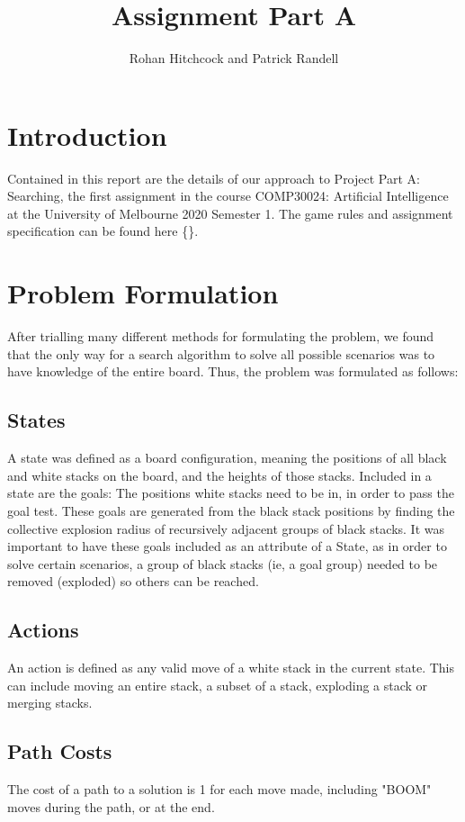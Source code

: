 \documentclass[11pt]{article}
\begin{document}
    \title{\textbf{Assignment Part A}}
    \author{Rohan Hitchcock and Patrick Randell}
    \date{}
    \maketitle
    \section{Introduction}\label{sec:introduction}
    Contained in this report are the details of our approach to Project Part A: Searching, the first assignment in the course
    COMP30024: Artificial Intelligence at the University of Melbourne 2020 Semester 1.
    The game rules and assignment specification
    can be found here \{\}.

    \section{Problem Formulation}\label{sec:problem-formulation}
    After trialling many different methods for formulating the problem, we found that the only way for a search
    algorithm to solve all possible scenarios was to have knowledge of the entire board.
    Thus, the problem was formulated as follows:
    \subsection{States}\label{subsec:states}
    A state was defined as a board configuration, meaning the positions of all black and white stacks on the board, and
    the heights of those stacks.
    Included in a state are the goals: The positions white stacks need to be in, in order to pass the goal test.
    These goals are generated from the black stack positions by finding the collective explosion radius of
    recursively adjacent groups of black stacks.
    It was important to have these goals included as an attribute of a State, as in order to solve certain scenarios,
    a group of black stacks (ie, a goal group) needed to be removed (exploded) so others can be reached.
    \subsection{Actions}\label{subsec:actions}
    An action is defined as any valid move of a white stack in the current state.
    This can include moving an entire stack, a subset of a stack, exploding a stack or merging stacks.
    \subsection{Path Costs}\label{subsec:path-costs}
    The cost of a path to a solution is 1 for each move made, including "BOOM" moves during the path, or at the end.
\end{document}
